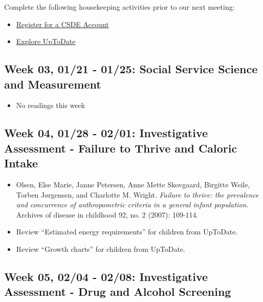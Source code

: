 \documentclass[11pt,]{article}
\providecommand{\tightlist}{%
  \setlength{\itemsep}{0pt}\setlength{\parskip}{0pt}}
\begin{document}
Complete the following housekeeping activities prior to our next
meeting:

\begin{itemize}
\tightlist
\item
  \href{https://csde.washington.edu/netid/account/new.php/}{Register for
  a CSDE Account}
\item
  \href{https://www.uptodate.com/}{Explore UpToDate}
\end{itemize}

\subsection{Week 03, 01/21 - 01/25: Social Service Science and
Measurement}\label{week-03-0121---0125-social-service-science-and-measurement}

\begin{itemize}
\tightlist
\item
  No readings this week
\end{itemize}

\subsection{Week 04, 01/28 - 02/01: Investigative Assessment - Failure
to Thrive and Caloric
Intake}\label{week-04-0128---0201-investigative-assessment---failure-to-thrive-and-caloric-intake}

\begin{itemize}
\item
  Olsen, Else Marie, Janne Petersen, Anne Mette Skovgaard, Birgitte
  Weile, Torben Jørgensen, and Charlotte M. Wright. \emph{Failure to
  thrive: the prevalence and concurrence of anthropometric criteria in a
  general infant population.} Archives of disease in childhood 92, no. 2
  (2007): 109-114.
\item
  Review ``Estimated energy requirements'' for children from UpToDate.
\item
  Review ``Growth charts'' for children from UpToDate.
\end{itemize}

\subsection{Week 05, 02/04 - 02/08: Investigative Assessment - Drug and
Alcohol
Screening}\label{week-05-0204---0208-investigative-assessment---drug-and-alcohol-screening}
\end{document}
